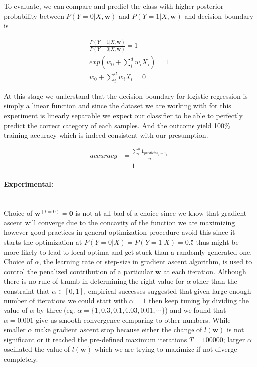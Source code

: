 \documentclass[a4paper]{article}
\begin{document}
	To evaluate, we can compare and predict the class with higher posterior probability between $P(Y=0|X, \mathbf{w})$ and $P(Y=1|X, \mathbf{w})$ and decision boundary is
		
	\begin{align}
		\frac{P(Y=1|X, \mathbf{w})}{P(Y=0|X, \mathbf{w})} = 1 \\ 
		exp(w_0 + \sum_i^d w_iX_i) = 1 \\ 
		w_0 + \sum_i^d w_iX_i = 0
	\end{align}
	
	At this stage we understand that the decision boundary for logistic regression is simply a linear function and since the dataset we are working with for this experiment is linearly separable we expect our classifier to be able to perfectly predict the correct category of each samples. And the outcome yield 100\% training accuracy which is indeed consistent with our presumption.
	
	\begin{align}
		accuracy &= \frac{\sum_i^n \mathbf{1}_{predicted_i = Y_i}}{n} \\ 
			&= 1
	\end{align}
	
\paragraph{Experimental:} ~\\

 	Choice of $\mathbf{w}^{(t=0)} = \mathbf{0}$ is not at all bad of a choice since we know that gradient ascent will converge due to the concavity of the function we are maximizing however good practices in general optimization procedure avoid this since it starts the optimization at $P(Y=0|X) = P(Y=1|X) = 0.5$ thus might be more likely to lead to local optima and get stuck than a randomly generated one. \\
	
	Choice of $\alpha$, the learning rate or step-size in gradient ascent algorithm, is used to control the penalized contribution of a particular $\mathbf{w}$ at each iteration. Although there is no rule of thumb in determining the right value for $\alpha$ other than the constraint that $\alpha \in [0,1]$, empirical successes suggested that given large enough number of iterations we could start with $\alpha = 1$ then keep tuning by dividing the value of $\alpha$ by three (eg. $\alpha = \{1, 0.3, 0.1, 0.03, 0.01, \cdots \}$) and we found that $\alpha = 0.001$ give us smooth convergence comparing to other numbers. While smaller $\alpha$ make gradient ascent stop because either the change of $l(\mathbf{w})$ is not significant or it reached the pre-defined maximum iterations $T=100000$; larger $\alpha$ oscillated the value of $l(\mathbf{w})$ which we are trying to maximize if not diverge completely.
\end{document}
